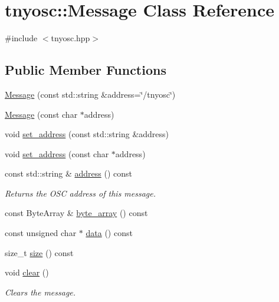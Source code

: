 \hypertarget{classtnyosc_1_1_message}{
\section{tnyosc::Message Class Reference}
\label{classtnyosc_1_1_message}
}


{\ttfamily \#include $<$tnyosc.hpp$>$}

\subsection*{Public Member Functions}
\begin{DoxyCompactItemize}
\item 
\hyperlink{classtnyosc_1_1_message_ac88e868ab5c1f59193c1d2cef1679e16}{Message} (const std::string \&address=\char`\"{}/tnyosc\char`\"{})
\item 
\hyperlink{classtnyosc_1_1_message_ae17d6dd92a0da1ac47996501f887ae6e}{Message} (const char $\ast$address)
\item 
void \hyperlink{classtnyosc_1_1_message_aa7ce6c220f685e5ad0402fecdb4403d4}{set\_\-address} (const std::string \&address)
\item 
void \hyperlink{classtnyosc_1_1_message_a38183562956c663f825b71cf2563a41a}{set\_\-address} (const char $\ast$address)
\item 
\hypertarget{classtnyosc_1_1_message_ad2ea4fa41da0ece7d1c218b88a6ee69e}{
const std::string \& \hyperlink{classtnyosc_1_1_message_ad2ea4fa41da0ece7d1c218b88a6ee69e}{address} () const }
\label{classtnyosc_1_1_message_ad2ea4fa41da0ece7d1c218b88a6ee69e}

\begin{DoxyCompactList}\small\item\em Returns the OSC address of this message. \end{DoxyCompactList}\item 
const ByteArray \& \hyperlink{classtnyosc_1_1_message_afd10bfa0c1e18f7b0ea10072acbb6618}{byte\_\-array} () const 
\item 
const unsigned char $\ast$ \hyperlink{classtnyosc_1_1_message_aa0ccc0dcd1bde1a59b9260f78c68ec1c}{data} () const 
\item 
size\_\-t \hyperlink{classtnyosc_1_1_message_ad146e1b298d0a8ff5fcc7f8234af5806}{size} () const 
\item 
\hypertarget{classtnyosc_1_1_message_ace39585edd14ff52ec60f25101bcfc71}{
void \hyperlink{classtnyosc_1_1_message_ace39585edd14ff52ec60f25101bcfc71}{clear} ()}
\label{classtnyosc_1_1_message_ace39585edd14ff52ec60f25101bcfc71}

\begin{DoxyCompactList}\small\item\em Clears the message. \end{DoxyCompactList}\end{DoxyCompactItemize}
